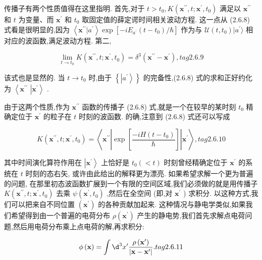\documentclass[lang=cn,newtx,10pt,scheme=chinese,thmcnt=section]{elegantbook}
\begin{document}
传播子有两个性质值得在这里指明. 首先,对于 $t > {t}_{0}, K\left( {{\mathbf{x}}^{\prime \prime }, t;{\mathbf{x}}^{\prime },{t}_{0}}\right)$ 满足以 ${\mathbf{x}}^{\prime \prime }$ 和 $t$ 为变量、而 ${\mathbf{x}}^{\prime }$ 和 ${t}_{0}$ 取固定值的薛定谔时间相关波动方程. 这一点从 (2.6.8) 式看是很明显的,因为 $\left\langle {{\mathbf{x}}^{\prime \prime } | {a}^{\prime }}\right\rangle \exp \left\lbrack {-i{E}_{{a}^{\prime }}\left( {t - {t}_{0}}\right) /\hbar }\right\rbrack$ 作为与 $\mathcal{U}\left( {t,{t}_{0}}\right) | {a}^{\prime }\rangle$ 相对应的波函数,满足波动方程. 第二,

$$
\mathop{\lim }\limits_{{t \rightarrow {t}_{0}}}K\left( {{\mathbf{x}}^{\prime \prime }, t;{\mathbf{x}}^{\prime },{t}_{0}}\right) = {\delta }^{3}\left( {{\mathbf{x}}^{\prime \prime } - {\mathbf{x}}^{\prime }}\right) , tag{2.6.9}
$$

该式也是显然的. 当 $t \rightarrow {t}_{0}$ 时,由于 $\left\{ \left| {a}^{\prime }\right\rangle \right\}$ 的完备性,(2.6.8) 式的求和正好约化为 $\left\langle {\mathbf{x}}^{\prime \prime }\right.$ $\left| {\mathbf{x}}^{\prime }\right\rangle$ .

由于这两个性质,作为 ${\mathbf{x}}^{\prime \prime }$ 函数的传播子 (2.6.8) 式,就是一个在较早的某时刻 ${t}_{0}$ 精确定位于 ${\mathbf{x}}^{\prime }$ 的粒子在 $t$ 时刻的波函数. 的确,注意到 (2.6.8) 式还可以写成

$$
K\left( {{\mathbf{x}}^{\prime \prime }, t;{\mathbf{x}}^{\prime },{t}_{0}}\right) = \left\langle {{\mathbf{x}}^{\prime \prime }\left| {\exp \left\lbrack \frac{-{iH}\left( {t - {t}_{0}}\right) }{\hbar }\right\rbrack }\right| {\mathbf{x}}^{\prime }}\right\rangle , tag{2.6.10}
$$

其中时间演化算符作用在 $\left| {\mathbf{x}}^{\prime }\right\rangle$ 上恰好是 ${t}_{0}\left( { < t}\right)$ 时刻曾经精确定位于 ${\mathbf{x}}^{\prime }$ 的系统在 $t$ 时刻的态右矢, 或许由此给出的解释更为漂亮. 如果希望求解一个更为普遍的问题, 在那里初态波函数扩展到一个有限的空间区域,我们必须做的就是用传播子 $K\left( {{\mathbf{x}}^{\prime \prime }, t;{\mathbf{x}}^{\prime },{t}_{0}}\right)$ 去乘 $\psi \left( {{\mathbf{x}}^{\prime },{t}_{0}}\right)$ ,然后在全空间 (即,对 ${\mathbf{x}}^{\prime }$ ) 求积分. 以这种方式,我们可以把来自不同位置 $\left( {\mathbf{x}}^{\prime }\right)$ 的各种贡献加起来. 这种情况与静电学类似,如果我们希望得到由一个普遍的电荷分布 $\rho \left( {\mathbf{x}}^{\prime }\right)$ 产生的静电势,我们首先求解点电荷问题,然后用电荷分布乘上点电荷的解,再求积分:

$$
\phi \left( \mathbf{x}\right) = \int {\d}^{3}{x}^{\prime }\frac{\rho \left( {\mathbf{x}}^{\prime }\right) }{\left| \mathbf{x} - {\mathbf{x}}^{\prime }\right| }. tag{2.6.11}
$$
\end{document}
